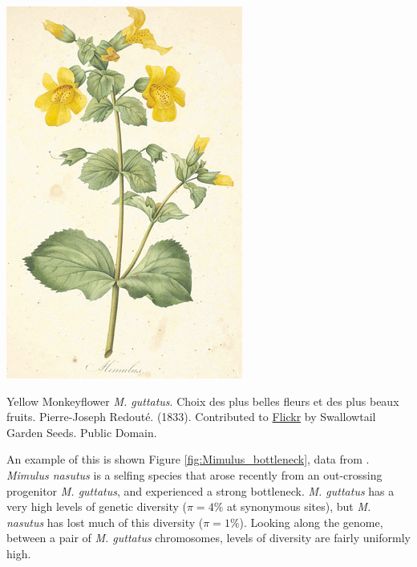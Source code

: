 \begin{marginfigure}[2cm]
\begin{center}
  \includegraphics[width = 0.75 \textwidth]{illustration_images/Genetic_drift/Mimulus/Mimulus.png}
\end{center}
\caption{Yellow Monkeyflower {\it M. guttatus}. \newline \noindent \tiny{ Choix des plus belles fleurs et des plus beaux fruits. Pierre-Joseph
  Redout\'e. (1833). Contributed to \href{https://www.flickr.com/photos/swallowtailgardenseeds/14479197839/in/photolist-o4tF54-od9My9-odbSn4-r7eVtm-qrR4xf-x4XVdi-owo7PM-r5mart-roPqqi-owrprg-qsfzJv-wMDeSy-oupCu9-oeSX38-odaeHf-ovbTTS-roEdyK-tCQBqn-odwyWa-otAUPX-oePwpE-odca2V-tBxNdi-roL99F-odbN4q-ot1HNN-ouhP5r-odcvRH-oveh86-rpAnnD-roE9j9-rowiBc-osDEHS-od7QxD-oeQ9yS-odatza-ox9fq8-oujGWa-osBqTm-ovoAKj-r5qRxT-oeRVxu-oux9q2-tMvxm3-x5pLez-owuL1t-oePFVJ-ov1yHY-oeWskU-tmeZzB}{Flickr} by Swallowtail Garden Seeds. Public Domain.}} \label{fig:Human_growth}  %
\end{marginfigure}
An example of this is shown Figure
\ref{fig:Mimulus_bottleneck}, data from \citeauthor{brandvain:14}. {\it Mimulus nasutus} is a selfing
species that arose recently from an out-crossing progenitor {\it M.
  guttatus}, and experienced a strong bottleneck. {\it M. guttatus} has a very high levels of genetic diversity
($\pi=4\%$ at synonymous sites), but {\it M. nasutus} has lost much 
of this diversity ($\pi =1\%$). Looking along the genome, between a
pair of {\it M. guttatus} chromosomes, levels of
diversity are fairly uniformly high.

